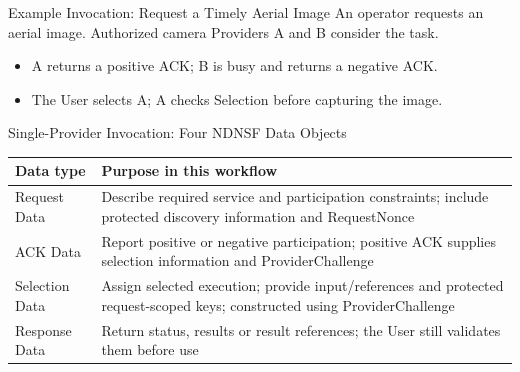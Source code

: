 \begin{frame}{Example Invocation: Request a Timely Aerial Image}
\small An operator requests an aerial image. Authorized camera Providers A and B consider the task.
\vspace{2mm}
\begin{center}
\end{center}
\begin{itemize}
\item A returns a positive ACK; B is busy and returns a negative ACK.
\item The User selects A; A checks Selection before capturing the image.
\end{itemize}
\end{frame}

\begin{frame}{Single-Provider Invocation: Four NDNSF Data Objects}
\small
\begin{tabularx}{\linewidth}{p{.19\linewidth}X}
\toprule Data type & Purpose in this workflow\\\midrule
Request Data & Describe required service and participation constraints; include protected discovery information and RequestNonce\\\midrule
ACK Data & Report positive or negative participation; positive ACK supplies selection information and ProviderChallenge\\\midrule
Selection Data & Assign selected execution; provide input/references and protected request-scoped keys; constructed using ProviderChallenge\\\midrule
Response Data & Return status, results or result references; the User still validates them before use\\\bottomrule
\end{tabularx}
\vspace{3mm}
\end{frame}

